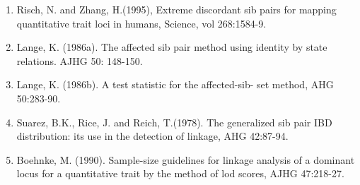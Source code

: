 \begin{enumerate}
\item Risch, N.  and Zhang, H.(1995), Extreme discordant sib pairs for mapping
quantitative trait loci in humans, Science, vol 268:1584-9.

\item Lange, K.  (1986a).  The affected sib pair method using identity by state
relations.  AJHG 50:  148-150.

\item Lange, K.  (1986b).  A test statistic for the affected-sib- set method,
AHG 50:283-90.

\item Suarez, B.K., Rice, J.  and Reich, T.(1978).  The generalized sib pair IBD
distribution:  its use in the detection of linkage, AHG 42:87-94.

\item Boehnke, M.  (1990).  Sample-size guidelines for linkage analysis of a
dominant locus for a quantitative trait by the method of lod scores, AJHG
47:218-27.

\end{enumerate}

